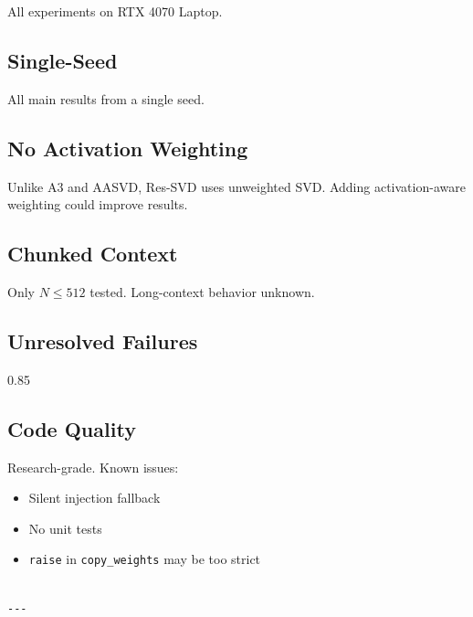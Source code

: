All experiments on RTX 4070 Laptop.

\subsection{Single-Seed}

All main results from a single seed.

\subsection{No Activation Weighting}

Unlike A3 and AASVD, Res-SVD uses unweighted SVD. Adding activation-aware 
weighting could improve results.

\subsection{Chunked Context}

Only $N \leq 512$ tested. Long-context behavior unknown.

\subsection{Unresolved Failures}

0.85

\subsection{Code Quality}

Research-grade. Known issues:
\begin{itemize}
\item Silent injection fallback
\item No unit tests
\item \texttt{raise} in \texttt{copy\_weights} may be too strict
\end{itemize}
\begin{lstlisting}

---
\end{lstlisting}